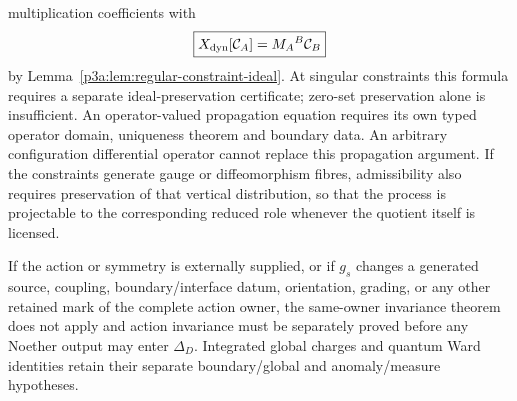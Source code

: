 \documentclass[12pt,a4paper]{article}
\begin{document}
\begin{theorem}
multiplication coefficients with
\[
 \boxed{X_{\rm dyn}[\mathcal C_A]=M_A{}^B\mathcal C_B}
\]
by Lemma~\ref{p3a:lem:regular-constraint-ideal}. At singular constraints this
formula requires a separate ideal-preservation certificate; zero-set
preservation alone is insufficient. An operator-valued propagation equation
requires its own typed operator domain, uniqueness theorem and boundary data.
An arbitrary configuration differential operator cannot replace this
propagation argument. If the
constraints generate gauge or diffeomorphism fibres, admissibility also
requires preservation of that vertical distribution, so that the process is
projectable to the corresponding reduced role whenever the quotient itself is
licensed.

If the action or symmetry is externally supplied, or if \(g_s\) changes a
generated source, coupling, boundary/interface datum, orientation, grading,
or any other retained mark of the complete action owner, the same-owner
invariance theorem does not apply and action invariance must be separately
proved before any Noether output may enter \(\Delta_D\).  Integrated global
charges and quantum Ward identities retain their separate boundary/global and
anomaly/measure hypotheses.
\end{theorem}
\end{document}
